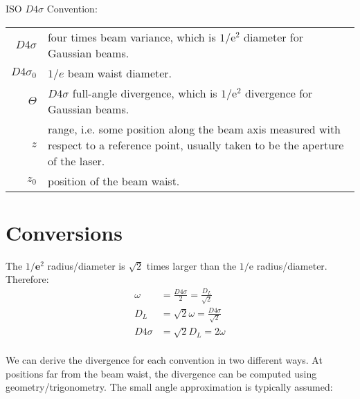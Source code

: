 \documentclass[]{article}
\begin{document}
ISO $D4\sigma$ Convention:

\begin{tabular}{rp{5in}}
    $D4\sigma$ & four times beam variance, which is $1/\text{e}^2$ diameter for Gaussian beams. \\
    $D4\sigma_0$ & $1/e$ beam waist diameter. \\
    $\Theta$ & $D4\sigma$ full-angle divergence, which is $1/\text{e}^2$ divergence for Gaussian beams. \\
    $z$ & range, i.e. some position along the beam axis measured with respect to a reference point, usually taken to be the aperture of the laser. \\
    $z_0$ & position of the beam waist.
\end{tabular}


\section{Conversions}


The $1/\textbf{e}^2$ radius/diameter is $\sqrt{2}$ times larger than the $1/\text{e}$ radius/diameter. Therefore:
\begin{align}
\omega &= \frac{D4\sigma}{2} = \frac{D_L}{\sqrt{2}} \\
D_L &= \sqrt{2}\omega = \frac{D4\sigma}{\sqrt{2}} \\
D4\sigma &= \sqrt{2} D_L = 2\omega \\
\end{align}

We can derive the divergence for each convention in two different ways.
At positions far from the beam waist, the divergence can be computed using geometry/trigonometry. The small angle approximation
is typically assumed:
\end{document}
